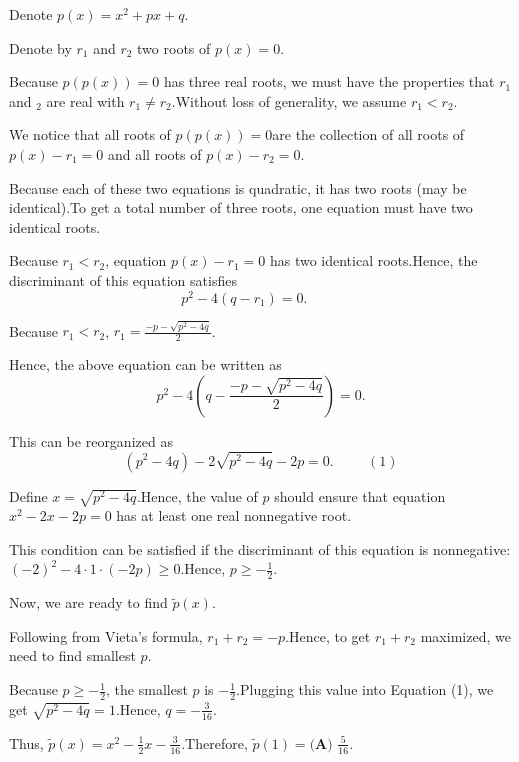 \begin{enumerate}
 Denote $p \left( x \right) = x^2 + p x + q$.

 Denote by $r_1$ and $r_2$ two roots of $p \left( x \right) = 0$.

 Because $p \left( p \left( x \right) \right) = 0$ has three real roots, we must have the properties that $r_1$ and $_2$ are real with $r_1 \neq r_2$.Without loss of generality, we assume $r_1 < r_2$.

 We notice that all roots of $p \left( p \left( x \right) \right) = 0$are the collection of all roots of $p \left( x \right) - r_1 = 0$ and all roots of $p \left( x \right) - r_2 = 0$.

 Because each of these two equations is quadratic, it has two roots (may be identical).To get a total number of three roots, one equation must have two identical roots.

 Because $r_1 < r_2$, equation $p \left( x \right) - r_1 = 0$  has two identical roots.Hence, the discriminant of this equation satisfies
 \[ p^2 - 4 \left( q - r_1 \right) = 0 . \hspace{1cm} \]

 Because $r_1 < r_2$, $r_1 = \frac{- p - \sqrt{p^2 - 4 q}}{2}$.

 Hence, the above equation can be written as
 \[ p^2 - 4 \left( q - \frac{- p - \sqrt{p^2 - 4 q}}{2} \right) = 0 . \]

 This can be reorganized as
 \[ \left( p^2 - 4 q \right) - 2 \sqrt{p^2 - 4 q} - 2 p = 0 . \hspace{1cm} (1) \]

 Define $x = \sqrt{p^2 - 4 q}$.Hence, the value of $p$ should ensure that equation $x^2 - 2 x - 2 p = 0$ has at least one real nonnegative root.

 This condition can be satisfied if the discriminant of this equation is nonnegative: $\left( -2 \right)^2 - 4 \cdot 1 \cdot \left( - 2 p \right) \geq 0$.Hence, $p \geq - \frac{1}{2}$.

 Now, we are ready to find $\tilde p \left( x \right)$.

 Following from Vieta's formula, $r_1 + r_2 = - p$.Hence, to get $r_1 + r_2$ maximized, we need to find smallest $p$.

 Because $p \geq - \frac{1}{2}$, the smallest $p$ is $-\frac{1}{2}$.Plugging this value into Equation (1), we get $\sqrt{p^2 - 4 q} = 1$.Hence, $q = - \frac{3}{16}$.

 Thus, $\tilde p \left( x \right) = x^2 - \frac{1}{2} x - \frac{3}{16}$.Therefore, $\tilde p \left( 1 \right) = \boxed{\textbf{(A) } \frac{5}{16}}$.


\end{enumerate}
